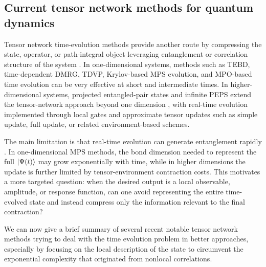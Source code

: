 \documentclass[12pt]{article}
\begin{document}
\subsection{Current tensor network methods for quantum dynamics}
Tensor network time-evolution methods provide another route by compressing the state, operator, or path-integral object leveraging entanglement or correlation structure of the system \cite{orusPracticalIntroductionTensor2014a, paeckelTimeevolutionMethodsMatrixproduct2019}. 
In one-dimensional systems, methods such as TEBD, time-dependent DMRG, TDVP, Krylov-based MPS evolution, and MPO-based time evolution \cite{vidalEfficientSimulationOneDimensional2004a, whiteRealTimeEvolutionUsing2004, daleyTimedependentDensitymatrixRenormalizationgroup2004, haegemanUnifyingTimeEvolution2016, zaletelTimeevolvingMatrixProduct2015} can be very effective at short and intermediate times.
In higher-dimensional systems, projected entangled-pair states and infinite PEPS extend the tensor-network approach beyond one dimension \cite{verstraeteCriticalityAreaLaw2006, jordanClassicalSimulationInfiniteSize2008, jiangAccurateDeterminationTensor2008a, pizornTimeEvolutionProjected2011, phienInfiniteProjectedEntangled2015, hubigTimedependentStudyDisordered2019}, with real-time evolution implemented through local gates and approximate tensor updates such as simple update, full update, or related environment-based schemes.

The main limitation is that real-time evolution can generate entanglement rapidly \cite{calabreseEvolutionEntanglementEntropy2005}. 
In one-dimensional MPS methods, the bond dimension needed to represent the full \(\ket{\Psi(t)}\) may grow exponentially with time, while in higher dimensions the update is further limited by tensor-environment contraction costs.
This motivates a more targeted question: when the desired output is a local observable, amplitude, or response function, can one avoid representing the entire time-evolved state and instead compress only the information relevant to the final contraction?

We can now give a brief summary of several recent notable tensor network methods trying to deal with the time evolution problem in better approaches, especially by focusing on the local description of the state to circumvent the exponential complexity that originated from nonlocal correlations. 
\end{document}
